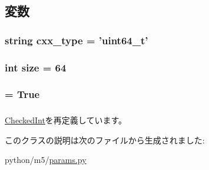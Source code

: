 \subsection{変数}
\hypertarget{classm5_1_1params_1_1MemorySize_a2f1553ebb79374a68b36fdd6d8d82fc3}{
\subsubsection[{cxx\_\-type}]{\setlength{\rightskip}{0pt plus 5cm}string {\bf cxx\_\-type} = 'uint64\_\-t'}}
\label{classm5_1_1params_1_1MemorySize_a2f1553ebb79374a68b36fdd6d8d82fc3}
\hypertarget{classm5_1_1params_1_1MemorySize_a439227feff9d7f55384e8780cfc2eb82}{
\subsubsection[{size}]{\setlength{\rightskip}{0pt plus 5cm}int {\bf size} = 64}}
\label{classm5_1_1params_1_1MemorySize_a439227feff9d7f55384e8780cfc2eb82}
\hypertarget{classm5_1_1params_1_1MemorySize_aca40206900cfc164654362fa8d4ad1e6}{
\subsubsection[{unsigned}]{ = True}}
\label{classm5_1_1params_1_1MemorySize_aca40206900cfc164654362fa8d4ad1e6}
\hypertarget{classm5_1_1params_1_1MemorySize_afcc7a4b78ecd8fa7e713f8cfa0f51017}{
\subsubsection[{value}]{}}
\label{classm5_1_1params_1_1MemorySize_afcc7a4b78ecd8fa7e713f8cfa0f51017}


\hyperlink{classm5_1_1params_1_1CheckedInt_afcc7a4b78ecd8fa7e713f8cfa0f51017}{CheckedInt}を再定義しています。

このクラスの説明は次のファイルから生成されました:\begin{DoxyCompactItemize}
\item 
python/m5/\hyperlink{params_8py}{params.py}\end{DoxyCompactItemize}
